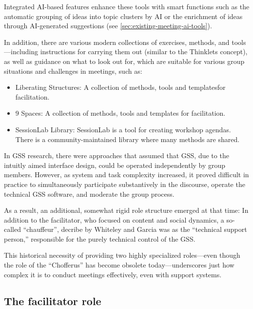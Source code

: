 Integrated AI-based features enhance these tools with smart functions such as the automatic grouping of ideas
into topic clusters by AI
or the enrichment of ideas through AI-generated suggestions
(see \autoref{sec:existing-meeting-ai-tools}).

In addition, there are various modern collections of exercises, methods, and tools—including instructions for
carrying them out (similar to the Thinklets concept), as well as guidance on what to look out for, which are suitable
for various group situations and challenges in meetings, such as:
\begin{itemize}
  \item Liberating Structures: A collection of methods, tools and templatesfor facilitation.
    \cite{LiberatingStructuresInnovation2024}
  \item 9 Spaces: A collection of methods, tools and templates for facilitation. \cite{9SpacesEntwickle}
  \item SessionLab Library: SessionLab is a tool for creating workshop agendas. There is a
    community-maintained library where many methods are shared. \cite{sessionlabsDesignFasterAI2025}
\end{itemize}

In GSS research, there were approaches that assumed that GSS, due to the intuitly aimed
interface design, could be operated independently by group members.
However, as system and task complexity increased, it proved difficult in practice to simultaneously
participate substantively in the discourse, operate the technical GSS software, and moderate the group process. \cite[p.
631]{ackermannGroupSupportSystems2021}

As a result, an additional, somewhat rigid role structure emerged at that time: In addition to the
facilitator, who focused on content and social dynamics,
a so-called “chauffeur”, decribe by Whiteley and Garcia was as the “technical support person,” responsible
for the purely technical
control of the GSS. \cite[p. 31]{whiteleyFacilitatorChauffeurGSS1996}

This historical necessity of providing two highly specialized roles—even though the role of the
“Chofferus” has become obsolete today—underscores just how complex it
is to conduct meetings effectively, even with support systems.

\subsection{The facilitator role}
\label{sec:facilitation}


